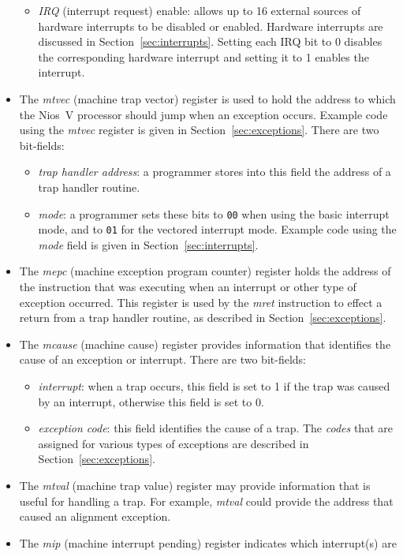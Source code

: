 \documentclass[11pt, twoside, pdftex]{article}
\begin{document}
\begin{itemize}
\begin{itemize}
\item {\it IRQ} (interrupt request) enable: allows up to 16 external sources of hardware
interrupts to be disabled or enabled. Hardware interrupts are discussed in 
Section~\ref{sec:interrupts}. Setting each IRQ bit to 0 disables the corresponding
hardware interrupt and setting it to 1 enables the interrupt.
\end{itemize}
\item The {\it mtvec} (machine trap vector) register is used to hold the address to which
the Nios~V processor should jump when an exception occurs. Example code using the
{\it mtvec} register is given in Section~\ref{sec:exceptions}.  There are two bit-fields:
\begin{itemize}
\item {\it trap handler address}: a programmer stores into this field the address of a trap
handler routine.
\item {\it mode}: a programmer sets these bits to \texttt{00} when using the basic interrupt
mode, and to \texttt{01} for the vectored interrupt mode. Example code using the
{\it mode} field is given in Section~\ref{sec:interrupts}.
\end{itemize}
\item The {\it mepc} (machine exception program counter) register holds the address of
the instruction that was executing when an interrupt or other type of exception occurred.
This register is used by the {\it mret} instruction to effect a return from a trap handler
routine, as described in Section~\ref{sec:exceptions}.
\item The {\it mcause} (machine cause) register provides information that identifies the
cause of an exception or interrupt. There are two bit-fields:
\begin{itemize}
\item {\it interrupt}: when a trap occurs, this field is set to 1 if the trap was caused
by an interrupt, otherwise this field is set to 0.
\item {\it exception code}: this field identifies the cause of a trap. The {\it codes} that are
assigned for various types of exceptions are described in Section~\ref{sec:exceptions}.
\end{itemize}
\item The {\it mtval} (machine trap value) register may provide information that is useful 
for handling a trap. For example, {\it mtval} could provide the address that caused an 
alignment exception.
\item The {\it mip} (machine interrupt pending) register indicates which interrupt(s) are 

\end{itemize}
\end{document}
